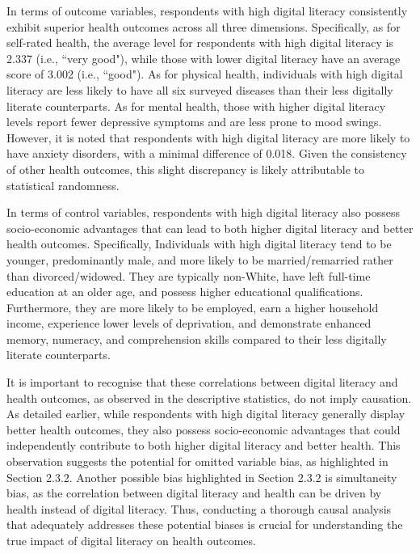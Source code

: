 In terms of outcome variables, respondents with high digital literacy consistently exhibit superior health outcomes across all three dimensions. Specifically, as for self-rated health, the average level for respondents with high digital literacy is 2.337 (i.e., ``very good"), while those with lower digital literacy have an average score of 3.002 (i.e., ``good"). As for physical health, individuals with high digital literacy are less likely to have all six surveyed diseases than their less digitally literate counterparts. As for mental health, those with higher digital literacy levels report fewer depressive symptoms and are less prone to mood swings. However, it is noted that respondents with high digital literacy are more likely to have anxiety disorders, with a minimal difference of 0.018. Given the consistency of other health outcomes, this slight discrepancy is likely attributable to statistical randomness.

In terms of control variables, respondents with high digital literacy also possess socio-economic advantages that can lead to both higher digital literacy and better health outcomes. Specifically, Individuals with high digital literacy tend to be younger, predominantly male, and more likely to be married/remarried rather than divorced/widowed. They are typically non-White, have left full-time education at an older age, and possess higher educational qualifications. Furthermore, they are more likely to be employed, earn a higher household income, experience lower levels of deprivation, and demonstrate enhanced memory, numeracy, and comprehension skills compared to their less digitally literate counterparts.

It is important to recognise that these correlations between digital literacy and health outcomes, as observed in the descriptive statistics, do not imply causation. As detailed earlier, while respondents with high digital literacy generally display better health outcomes, they also possess socio-economic advantages that could independently contribute to both higher digital literacy and better health. This observation suggests the potential for omitted variable bias, as highlighted in Section 2.3.2. Another possible bias highlighted in Section 2.3.2 is simultaneity bias, as the correlation between digital literacy and health can be driven by health instead of digital literacy. Thus, conducting a thorough causal analysis that adequately addresses these potential biases is crucial for understanding the true impact of digital literacy on health outcomes.

